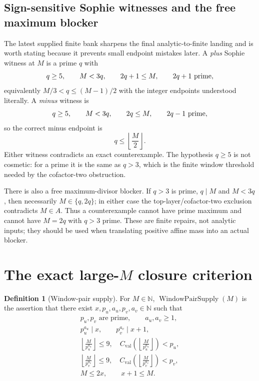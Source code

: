 \documentclass[11pt]{article}
\theoremstyle{definition}
\newtheorem{definition}[theorem]{Definition}
\newcommand{\N}{\mathbb N}
\newcommand{\1}{\mathbf 1}
\newcommand{\WPS}{\operatorname{WindowPairSupply}}
\begin{document}
\subsection{Sign-sensitive Sophie witnesses and the free maximum blocker}

The latest supplied finite bank sharpens the final analytic-to-finite landing and is worth stating because it
prevents small endpoint mistakes later.  A \emph{plus} Sophie witness at $M$ is a prime $q$ with
\[
 q\ge5,\qquad M<3q,\qquad 2q+1\le M,\qquad 2q+1\ \hbox{prime},
\]
equivalently $M/3<q\le (M-1)/2$ with the integer endpoints understood literally.  A \emph{minus} witness is
\[
 q\ge5,\qquad M<3q,\qquad 2q\le M,\qquad 2q-1\ \hbox{prime},
\]
so the correct minus endpoint is
\[
 \boxed{q\le\left\lfloor\frac M2\right\rfloor.}
\]
Either witness contradicts an exact counterexample.  The hypothesis $q\ge5$ is not cosmetic: for a prime it is
the same as $q>3$, which is the finite window threshold needed by the cofactor-two obstruction.

There is also a free maximum-divisor blocker.  If $q>3$ is prime, $q\mid M$ and $M<3q$, then necessarily
$M\in\{q,2q\}$; in either case the top-layer/cofactor-two exclusion contradicts $M\in A$.  Thus a counterexample
cannot have prime maximum and cannot have $M=2q$ with $q>3$ prime.  These are finite repairs, not analytic
inputs; they should be used when translating positive affine mass into an actual blocker.

\section{The exact large-$M$ closure criterion}

\begin{definition}[Window-pair supply]
For $M\in\N$, $\WPS(M)$ is the assertion that there exist
$x,p_u,a_u,p_v,a_v\in\N$ such that
\[
\begin{gathered}
p_u,p_v\text{ are prime},\qquad a_u,a_v\ge1,\\
p_u^{a_u}\mid x,\qquad p_v^{a_v}\mid x+1,\\
\left\lfloor\frac M{p_u^{a_u}}\right\rfloor\le9,
\quad C_{\mathrm{val}}\!\left(\left\lfloor\frac M{p_u^{a_u}}\right\rfloor\right)<p_u,\\
\left\lfloor\frac M{p_v^{a_v}}\right\rfloor\le9,
\quad C_{\mathrm{val}}\!\left(\left\lfloor\frac M{p_v^{a_v}}\right\rfloor\right)<p_v,\\
M\le2x,
\qquad x+1\le M.
\end{gathered}
\]
\end{definition}
\end{document}
